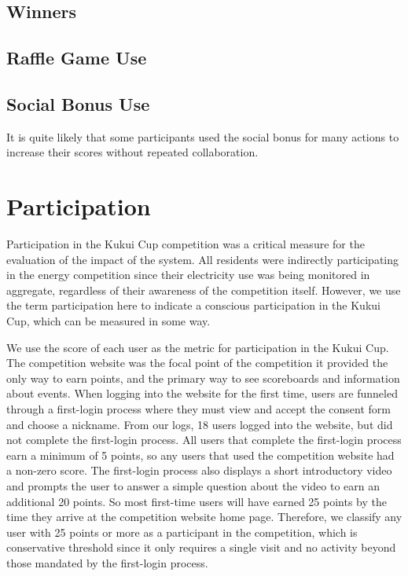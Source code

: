 
\subsection{Winners}






\subsection{Raffle Game Use}


\subsection{Social Bonus Use}

It is quite likely that some participants used the social bonus for many actions to increase their scores without repeated collaboration. 


\section{Participation}
\label{sec:participation}

Participation in the Kukui Cup competition was a critical measure for the evaluation of the impact of the system. All residents were indirectly participating in the energy competition since their electricity use was being monitored in aggregate, regardless of their awareness of the competition itself. However, we use the term participation here to indicate a conscious participation in the Kukui Cup, which can be measured in some way.

We use the score of each user as the metric for participation in the Kukui Cup. The competition website was the focal point of the competition it provided the only way to earn points, and the primary way to see scoreboards and information about events. When logging into the website for the first time, users are funneled through a first-login process where they must view and accept the consent form and choose a nickname. From our logs, 18 users logged into the website, but did not complete the first-login process. All users that complete the first-login process earn a minimum of 5 points, so any users that used the competition website had a non-zero score. The first-login process also displays a short introductory video and prompts the user to answer a simple question about the video to earn an additional 20 points. So most first-time users will have earned 25 points by the time they arrive at the competition website home page. Therefore, we classify any user with 25 points or more as a participant in the competition, which is conservative threshold since it only requires a single visit and no activity beyond those mandated by the first-login process.

